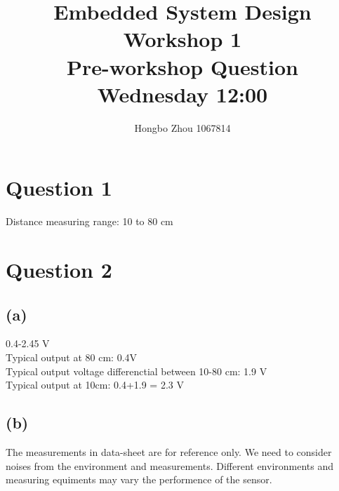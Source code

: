 \documentclass[12pt]{article}
\title{Embedded System Design Workshop 1\\
Pre-workshop Question \\
Wednesday 12:00}
\author{
    Hongbo Zhou 1067814
}
\date{}
\begin{document}
\maketitle

\section*{Question 1}
Distance measuring range: 10 to 80 cm

\section*{Question 2}
\subsection*{(a)}
0.4-2.45 V \\
Typical output at 80 cm: 0.4V \\
Typical output voltage differenctial between 10-80 cm: 1.9 V \\
Typical output at 10cm: 0.4+1.9 = 2.3 V
\subsection*{(b)}
The measurements in data-sheet are for reference only. We need to consider noises from the environment and measurements.
Different environments and measuring equiments may vary the performence of the sensor.
\end{document}
